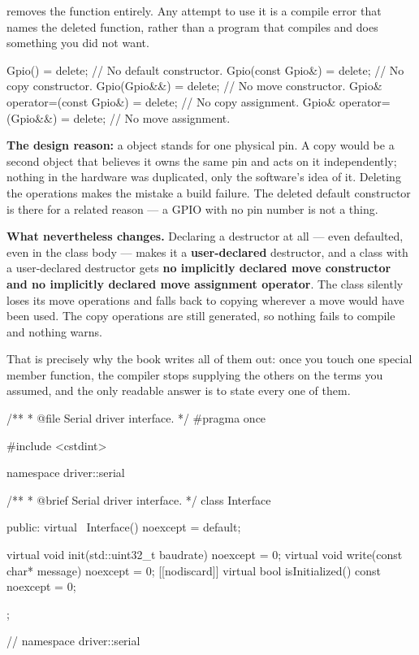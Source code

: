\textbf{} removes the function entirely. Any attempt to use it is a compile error
that names the deleted function, rather than a program that compiles and does something you did not
want. 

\begin{cppcode}
Gpio()                       = delete; // No default constructor.
Gpio(const Gpio&)            = delete; // No copy constructor.
Gpio(Gpio&&)                 = delete; // No move constructor.
Gpio& operator=(const Gpio&) = delete; // No copy assignment.
Gpio& operator=(Gpio&&)      = delete; // No move assignment.
\end{cppcode}

\noindent\textbf{The design reason:} a  object stands for one physical pin. A copy would
be a second object that believes it owns the same pin and acts on it independently; nothing in the
hardware was duplicated, only the software's idea of it. Deleting the operations makes the mistake a
build failure. The deleted default constructor is there for a related reason --- a GPIO with no pin
number is not a thing. 

\textbf{What  nevertheless changes.} Declaring a destructor at
all --- even defaulted, even in the class body --- makes it a \textbf{user-declared} destructor, and
a class with a user-declared destructor gets \textbf{no implicitly declared move constructor and no
implicitly declared move assignment operator}. The class silently loses its move operations and
falls back to copying wherever a move would have been used. The copy operations are still
generated, so nothing fails to compile and nothing warns.

That is precisely why the book writes all of them out: once you touch one special member function,
the compiler stops supplying the others on the terms you assumed, and the only readable answer is to
state every one of them. 


\begin{cppcode}
/**
 * @file Serial driver interface.
 */
#pragma once

#include <cstdint>

namespace driver::serial
{
/**
 * @brief Serial driver interface.
 */
class Interface
{
public:
    virtual ~Interface() noexcept = default;

    virtual void init(std::uint32_t baudrate) noexcept        = 0;
    virtual void write(const char* message) noexcept          = 0;
    [[nodiscard]] virtual bool isInitialized() const noexcept = 0;
};
} // namespace driver::serial
\end{cppcode}

